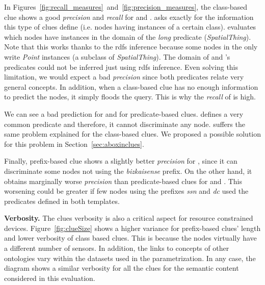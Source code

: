 In Figures~\ref{fig:recall_measures}~and~\ref{fig:precision_measures}, the class-based clue shows a good \emph{precision} and \emph{recall} for \tplone{} and \tpltwo{}.
\tplone{} asks exactly for the information this type of clues define (i.e. nodes having instances of a certain class).
\tpltwo{} evaluates which nodes have instances in the domain of the \emph{long} predicate (\emph{SpatialThing}).
Note that this works thanks to the \acs{rdfs} inference because some nodes in the \Space{} only write \emph{Point} instances (a subclass of \emph{SpatialThing}).
The domain of \tplthree{} and \tplfive{}'s predicates could not be inferred just using \acs{rdfs} inference. %
Even solving this limitation, we would expect a bad \emph{precision} since both predicates relate very general concepts.
In addition, when a class-based clue has no enough information to predict the nodes, it simply floods the query.
This is why the \emph{recall} of \tplfour{} is high.





We can see a bad prediction for \tplone{} and \tplfour{} for predicate-based clues.
\tplone{} defines a very common predicate and therefore, it cannot discriminate any node.
\tplfour{} suffers the same problem explained for the class-based clues.
We proposed a possible solution for this problem in Section~\ref{sec:aboxinclues}.

Finally, prefix-based clue shows a slightly better \emph{precision} for \tplfour{}, since it can discriminate some nodes not using the \emph{bizkaisense} prefix.
On the other hand, it obtains marginally worse \emph{precision} than predicate-based clues for \tplthree{} and \tplfive{}.
This worsening could be greater if few nodes using the prefixes \emph{ssn} and \emph{dc} used the predicates defined in both templates.

\medskip

\noindent\textbf{Verbosity.}
The clues verbosity is also a critical aspect for resource constrained devices.
Figure~\ref{fig:clueSize} shows a higher variance for prefix-based clues' length and lower verbosity of class based clues.
This is because the nodes virtually have a different number of sensors.
In addition, the links to concepts of other ontologies vary within the datasets used in the parametrization.
In any case, the diagram shows a similar verbosity for all the clues for the semantic content considered in this evaluation. %


